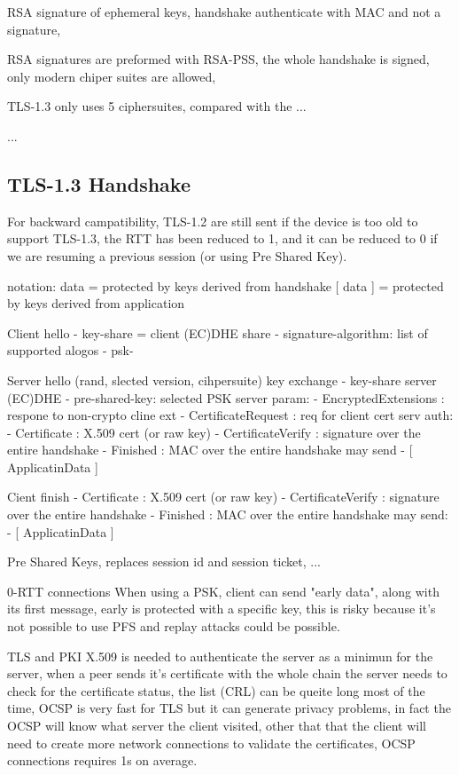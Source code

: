 \documentclass[12pt]{article}
\begin{document}
RSA signature of ephemeral keys, handshake authenticate with MAC and not a signature,

RSA signatures are preformed with RSA-PSS, the whole handshake is signed, only modern chiper suites are allowed,

TLS-1.3 only uses 5 ciphersuites, compared with the ...

...

\subsection{TLS-1.3 Handshake}
For backward campatibility, TLS-1.2 are still sent if the device is too old to support TLS-1.3, the RTT has been reduced to 1, and it can be reduced to 0 if we are resuming a previous session (or using Pre Shared Key). 

notation:
{ data } = protected by keys derived from handshake
[ data ] = protected by keys derived from application

Client hello
- key-share = client (EC)DHE share
- signature-algorithm: list of supported alogos
- psk-

Server hello
(rand, slected version, cihpersuite)
key exchange
- key-share server (EC)DHE
- pre-shared-key: selected PSK 
server param:
- { EncryptedExtensions }: respone to non-crypto cline ext
- { CertificateRequest }: req for client cert
serv auth:
- { Certificate }: X.509 cert (or raw key)
- { CertificateVerify }: signature over the entire handshake
- { Finished }: MAC over the entire handshake
may send
- [ ApplicatinData ]

Cient finish
- { Certificate }: X.509 cert (or raw key)
- { CertificateVerify }: signature over the entire handshake
- { Finished }: MAC over the entire handshake
may send:
- [ ApplicatinData ]


Pre Shared Keys, replaces session id and session ticket,
... 

0-RTT connections
When using a PSK, client can send "early data", along with its first message, early is protected with a specific key, this is risky because it's not possible to use PFS and replay attacks could be possible. 


TLS and PKI 
X.509 is needed to authenticate the server as a minimun for the server, when a peer sends it's certificate with the whole chain the server needs to check for the certificate status, the list (CRL) can be queite long most of the time, OCSP is very fast for TLS but it can generate privacy problems, in fact the OCSP will know what server the client visited, other that that the client will need to create more network connections to validate the certificates, OCSP connections requires 1s on average.
\end{document}
